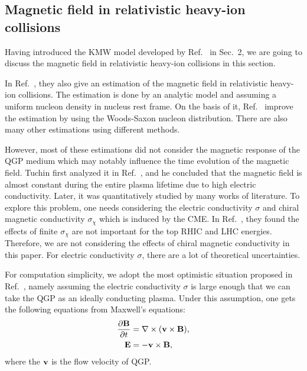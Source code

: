 \documentclass[a4paper,10pt,twoside]{cpc-hepnp}
\begin{document}
\begin{CJK*}{GBK}{song}
\begin{multicols}{2}
\section{Magnetic field in relativistic heavy-ion collisions}\label{eBinHIC}
Having introduced the KMW model developed by Ref.~\cite{Kharzeev:2007jp} in Sec.~2, we are going to discuss the magnetic field in relativistic heavy-ion collisions in this section.

In Ref.~\cite{Kharzeev:2007jp}, they also give an estimation of the magnetic field in relativistic heavy-ion collisions. The estimation is done by an analytic model and assuming a uniform nucleon density in nucleus rest frame. On the basis of it, Ref.~\cite{Mo:2013qya} improve the estimation by using the Woods-Saxon nucleon distribution. There are also many other estimations using different methods\cite{Skokov:2009qp,Voronyuk:2011jd,Bzdak:2011yy,Deng:2012pc,Tuchin:2013apa}.

However, most of these estimations did not consider the magnetic response of the QGP medium which may notably influence the time evolution of the magnetic field. Tuchin first analyzed it in Ref.~\cite{Tuchin:2010vs,Tuchin:2010vs2}, and he concluded that the magnetic field is almost constant during the entire plasma lifetime due to high electric conductivity.
Later, it was quantitatively studied by many works of literature\cite{Deng:2012pc,Tuchin:2013apa,McLerran:2013hla,Tuchin:2013ie,Zakharov:2014dia,Tuchin:2014iua,Tuchin:2015oka}. To explore this problem, one needs considering the electric conductivity $\sigma$ and chiral magnetic conductivity $\sigma_\chi$ which is induced by the CME.  In Ref.~\cite{McLerran:2013hla}, they found the effects of finite $\sigma_\chi$ are not important for the top RHIC and LHC energies. Therefore, we are not considering the effects of chiral magnetic conductivity in this paper. For electric conductivity $\sigma$, there are a lot of theoretical uncertainties\cite{Arnold:2003zc, Gupta:2003zh, Ding:2010ga, Francis:2011bt}.

For computation simplicity, we adopt the most optimistic situation proposed in Ref.~\cite{Deng:2012pc}, namely assuming the electric conductivity $\sigma$ is large enough that we can take the QGP as an ideally conducting plasma. Under this assumption, one gets the following equations from Maxwell's equations:
\begin{align}
\frac{\partial \vb{B}}{\partial t} &= \nabla \times (\vb{v} \times \vb{B}),\label{eq:pBpt}  \\
\vb{E} &= - \vb{v} \times \vb{B}, \label{eq:E}
\end{align}
where the $\vb{v}$ is the flow velocity of QGP.


\end{multicols}
\end{CJK*}
\end{document}
